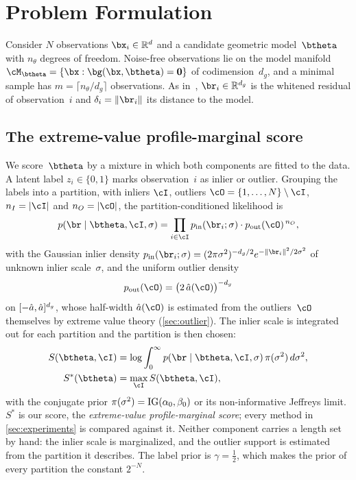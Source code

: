 \section{Problem Formulation}
\label{sec:method}

Consider $N$ observations $\bx_i \in \Reals^d$ and a candidate geometric
model~$\btheta$ with $n_\theta$ degrees of freedom.  Noise-free observations
lie on the model manifold $\cM_{\btheta} = \{\bx : \bg(\bx, \btheta) =
\bzero\}$ of codimension~$d_g$, and a minimal sample has
$m = \lceil n_\theta/d_g \rceil$ observations.  As in~\cite{Pritts2026},
$\br_i \in \Reals^{d_g}$ is the whitened residual of observation~$i$ and
$\delta_i = \|\br_i\|$ its distance to the model.

\subsection{The extreme-value profile-marginal score}
\label{sec:evpm}

We score~$\btheta$ by a \gaussunif mixture in which both components are
fitted to the data.  A latent label $z_i \in \{0,1\}$ marks observation~$i$
as inlier or outlier.  Grouping the labels into a partition, with inliers
$\cI$, outliers $\cO = \{1,\ldots,N\}\setminus\cI$, $n_I = |\cI|$ and
$n_O = |\cO|$, the partition-conditioned likelihood is
\begin{equation}
	p(\br \mid \btheta, \cI, \sigma)
	= \prod_{i\in\cI} \pin(\br_i;\sigma) \cdot \pout(\cO)^{\,n_O},
	\label{eq:partition-likelihood}
\end{equation}
with the Gaussian inlier density
$\pin(\br_i;\sigma) = (2\pi\sigma^2)^{-d_g/2}e^{-\|\br_i\|^2/2\sigma^2}$ of
unknown inlier scale~$\sigma$, and the uniform outlier density
\begin{equation}
	\pout(\cO) = \bigl(2\,\ahat(\cO)\bigr)^{-d_g}
	\label{eq:pout}
\end{equation}
on $[-\hat a, \hat a]^{d_g}$, whose half-width $\ahat(\cO)$ is estimated from
the outliers~$\cO$ themselves by extreme value theory (\cref{sec:outlier}).
The inlier scale is integrated out for each partition and the partition is
then chosen:
\begin{align}
	S(\btheta, \cI) & = \log\int_0^\infty
	p(\br \mid \btheta, \cI, \sigma)\,\pi(\sigma^2)\,d\sigma^2,
	\label{eq:evpm}                                                  \\
	S^*(\btheta)    & = \max_{\cI} S(\btheta, \cI),
	\label{eq:evpm-profile}
\end{align}
with the conjugate prior $\pi(\sigma^2) = \mathrm{IG}(\alpha_0, \beta_0)$ or its
non-informative Jeffreys limit.  $S^*$ is our score, the
\emph{extreme-value profile-marginal score}; every method in
\cref{sec:experiments} is compared against it.  Neither component carries a length set by
hand: the inlier scale is marginalized, and the outlier support is
estimated from the partition it describes.  The label prior is
$\gamma = \tfrac12$, which makes the prior of every partition the constant
$2^{-N}$.

